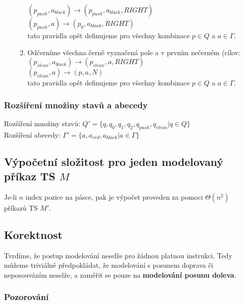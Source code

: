 \documentclass[a4paper,12pt]{article} %
\begin{document}
\begin{itemize}
\begin{enumerate}
        $(p_{push}, a_{black}) \to (p_{push}, a_{black}, RIGHT)$ \\
        $(p_{push}, a) \to (p_{0}, a_{black}, RIGHT)$\\
        tato pravidla opět definujeme pro všechny kombinace $p \in Q$ a $a \in \Gamma$.
        \item Odčerníme všechna černě vyznačená pole a v prvním nečerném (cílov:\\
        $(p_{clean}, a_{black}) \to (p_{clean}, a, RIGHT)$ \\
        $(p_{clean}, a) \to (p, a, N)$\\
        tato pravidla opět definujeme pro všechny kombinace $p \in Q$ a $a \in \Gamma$.
    \end{enumerate}
\end{itemize}

\subsubsection*{Rozšíření množiny stavů a abecedy}

Rozšíření množiny stavů: $Q' = \{q, q_0, q_1, q_2, q_{push}, q_{clean} | q \in Q\}$\\
Rozšíření abecedy: $\Gamma' = \{a, a_{red}, a_{black} | a \in \Gamma\}$

\subsection*{Výpočetní složitost pro jeden modelovaný příkaz TS $M$}

Je-li $n$ index pozice na pásce, pak je výpočet proveden za pomoci $\Theta(n^2)$ příkazů TS $M'$.

\subsection*{Korektnost}

Tvrdíme, že postup modelování neselže pro žádnou platnou instrukci. Tedy můžeme triviálně předpokládat, že modelování s posunem doprava či neposouváním neselže, a zaměřit se pouze na \textbf{modelování posunu doleva}.

\subsubsection*{Pozorování}
\end{document}
